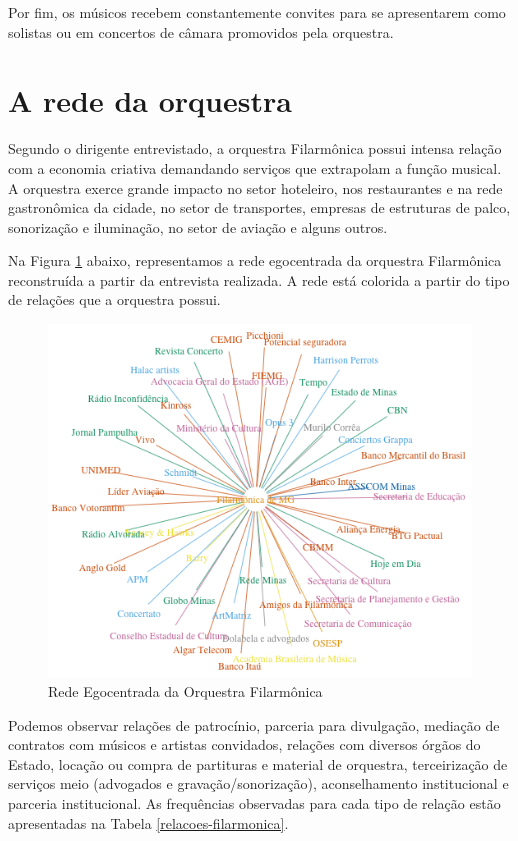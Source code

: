\documentclass[a4paper, 12pt, openright, oneside, german, french, english, brazil]{abntex2}
\begin{document}
	Por fim, os músicos recebem constantemente convites para se apresentarem como solistas ou em concertos de câmara promovidos pela orquestra.
	
	
	\section{A rede da orquestra}
	
	Segundo o dirigente entrevistado, a orquestra Filarmônica possui intensa relação com a economia criativa demandando serviços que extrapolam a função musical. A orquestra exerce grande impacto no setor hoteleiro, nos restaurantes e na rede gastronômica da cidade, no setor de transportes, empresas de estruturas de palco, sonorização e iluminação, no setor de aviação e alguns outros.
	
	Na Figura \ref{rede-filarmonica} abaixo, representamos a rede egocentrada da orquestra Filarmônica reconstruída a partir da entrevista realizada. A rede está colorida a partir do tipo de relações que a orquestra possui.
	
	\begin{figure}[!ht]
		\centering
		\caption{Rede Egocentrada da Orquestra Filarmônica}
		\label{rede-filarmonica}
		\includegraphics[scale=.7]{rede_filarmonica.png}
	\end{figure}
	
	Podemos observar relações de patrocínio, parceria para divulgação, mediação de contratos com músicos e artistas convidados, relações com diversos órgãos do Estado, locação ou compra de partituras e material de orquestra, terceirização de serviços meio (advogados e gravação/sonorização), aconselhamento institucional e parceria institucional. As frequências observadas para cada tipo de relação estão apresentadas na Tabela \ref{relacoes-filarmonica}. 
	
\end{document}
